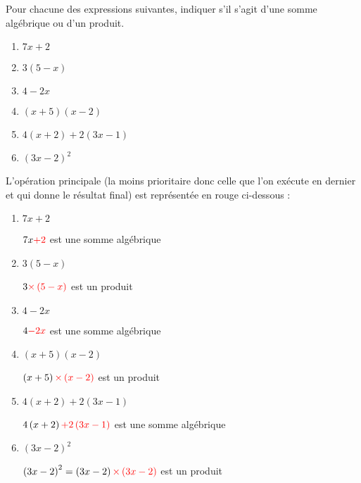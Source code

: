 
Pour chacune des expressions suivantes, indiquer s'il s'agit d'une somme algébrique ou d'un produit.
\begin{enumerate}
     \item
     $7x+2$
     \item
     $3\left(5-x\right)$
     \item
     $4-2x$
     \item
     $\left(x+5\right)\left(x-2\right)$
     \item
     $4\left(x+2\right)+2\left(3x-1\right)$
     \item
     $\left(3x-2\right)^{2}$
\end{enumerate}
\begin{corrige}
     L'opération principale (la moins prioritaire donc celle que l'on exécute en dernier et qui donne le résultat final)  est représentée en rouge ci-dessous :
     \begin{enumerate}
          \item
          $7x+2$
          \par
          $7x\color{red}{+}2$ est une somme algébrique
          \item
          $3\left(5-x\right)$
          \par
          $3\color{red}{\times }\left(5-x\right)$ est un produit
          \item
          $4-2x$
          \par
          $4\color{red}{-}2x$ est une somme algébrique
          \item
          $\left(x+5\right)\left(x-2\right)$
          \par
          $\left(x+5\right)\color{red}{\times }\left(x-2\right)$ est un produit
          \item
          $4\left(x+2\right)+2\left(3x-1\right)$
          \par
          $4\left(x+2\right)\color{red}{+}2\left(3x-1\right)$ est une somme algébrique
          \item
          $\left(3x-2\right)^{2}$
          \par
          $\left(3x-2\right)^{2}=\left(3x-2\right)\color{red}{\times }\left(3x-2\right)$ est un produit
     \end{enumerate}
\end{corrige}

